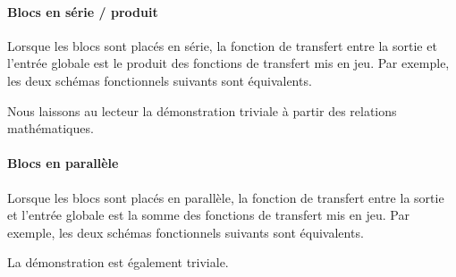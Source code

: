 \paragraph{Blocs en série / produit}
Lorsque les blocs sont placés en série, la fonction de transfert 
entre la sortie et l'entrée globale est le produit des fonctions de 
transfert mis en jeu. Par exemple, les deux schémas fonctionnels suivants 
sont équivalents.
\begin{center}

\end{center}
\begin{center}

\end{center}
Nous laissons au lecteur la démonstration triviale à partir des relations 
mathématiques.
\paragraph{Blocs en parallèle} 
Lorsque les blocs sont placés en parallèle, la fonction de transfert 
entre la sortie et l'entrée globale est la somme des fonctions de transfert 
mis en jeu. Par exemple, les deux schémas fonctionnels suivants 
sont équivalents.
\begin{center}
    
\end{center}
\begin{center}
    
\end{center}
La démonstration est également triviale.
\newpage

\captionsetup{width=0.9\linewidth}
